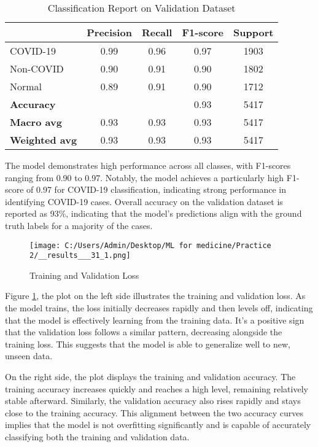 \documentclass{article}
\begin{document}
\begin{table}[htbp]
    \centering
    \caption{Classification Report on Validation Dataset}
    \begin{tabular}{lcccc}
        \toprule
        & \textbf{Precision} & \textbf{Recall} & \textbf{F1-score} & \textbf{Support} \\
        \midrule
        COVID-19 & 0.99 & 0.96 & 0.97 & 1903 \\
        Non-COVID & 0.90 & 0.91 & 0.90 & 1802 \\
        Normal & 0.89 & 0.91 & 0.90 & 1712 \\
        \midrule
        \textbf{Accuracy} & & & 0.93 & 5417 \\
        \textbf{Macro avg} & 0.93 & 0.93 & 0.93 & 5417 \\
        \textbf{Weighted avg} & 0.93 & 0.93 & 0.93 & 5417 \\
        \bottomrule
    \end{tabular}
\end{table}

The model demonstrates high performance across all classes, with F1-scores ranging from 0.90 to 0.97.
Notably, the model achieves a particularly high F1-score of 0.97 for COVID-19 classification, indicating strong performance in identifying COVID-19 cases.
Overall accuracy on the validation dataset is reported as 93\%, indicating that the model's predictions align with the ground truth labels for a majority of the cases.

\begin{figure}[htbp]
    \centering
    \texttt{[image: C:/Users/Admin/Desktop/ML for medicine/Practice 2/\_\_results\_\_\_31\_1.png]}
    \caption{Training and Validation Loss}
    \label{fig:training}
\end{figure}

Figure \ref{fig:training}, the plot on the left side illustrates the training and validation loss. As the model trains, the loss initially decreases rapidly and then levels off, indicating that the model is effectively learning from the training data. It's a positive sign that the validation loss follows a similar pattern, decreasing alongside the training loss. This suggests that the model is able to generalize well to new, unseen data.

On the right side, the plot displays the training and validation accuracy. The training accuracy increases quickly and reaches a high level, remaining relatively stable afterward. Similarly, the validation accuracy also rises rapidly and stays close to the training accuracy. This alignment between the two accuracy curves implies that the model is not overfitting significantly and is capable of accurately classifying both the training and validation data.
\end{document}
